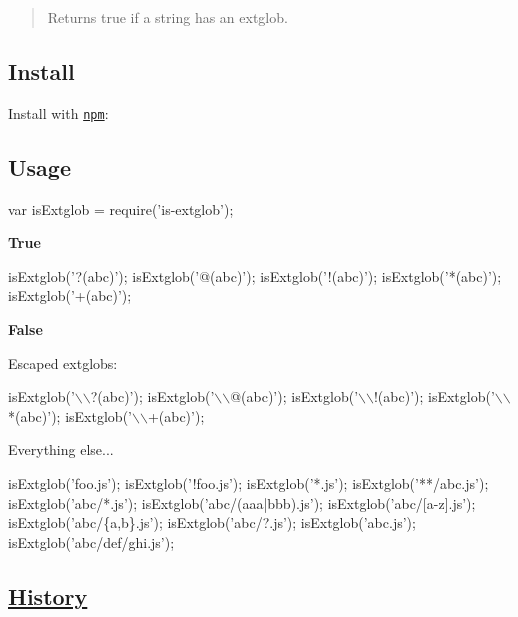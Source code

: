 \begin{quote}
Returns true if a string has an extglob. \end{quote}


\subsection*{Install}

Install with \href{https://www.npmjs.com/}{\tt npm}\+:




\subsection*{Usage}


\begin{DoxyCode}
var isExtglob = require('is-extglob');
\end{DoxyCode}


{\bfseries True}


\begin{DoxyCode}
isExtglob('?(abc)');
isExtglob('@(abc)');
isExtglob('!(abc)');
isExtglob('*(abc)');
isExtglob('+(abc)');
\end{DoxyCode}


{\bfseries False}

Escaped extglobs\+:


\begin{DoxyCode}
isExtglob('\(\backslash\)\(\backslash\)?(abc)');
isExtglob('\(\backslash\)\(\backslash\)@(abc)');
isExtglob('\(\backslash\)\(\backslash\)!(abc)');
isExtglob('\(\backslash\)\(\backslash\)*(abc)');
isExtglob('\(\backslash\)\(\backslash\)+(abc)');
\end{DoxyCode}


Everything else...


\begin{DoxyCode}
isExtglob('foo.js');
isExtglob('!foo.js');
isExtglob('*.js');
isExtglob('**/abc.js');
isExtglob('abc/*.js');
isExtglob('abc/(aaa|bbb).js');
isExtglob('abc/[a-z].js');
isExtglob('abc/\{a,b\}.js');
isExtglob('abc/?.js');
isExtglob('abc.js');
isExtglob('abc/def/ghi.js');
\end{DoxyCode}


\subsection*{\mbox{\hyperlink{interface_history}{History}}}

